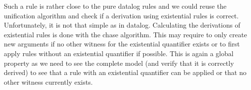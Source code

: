Such a rule is rather close to the pure datalog rules and we could reuse the unification algorithm and check if a derivation using existential rules is correct. Unfortunately, it is not that simple as in datalog. Calculating the derivations of existential rules is done with the chase algorithm. This may require to only create new arguments if no other witness for the existential quantifier exists or to first apply rules without an existential quantifier if possible. This is again a global property as we need to see the complete model (and verify that it is correctly derived) to see that a rule with an existential quantifier can be applied or that no other witness currently exists.



